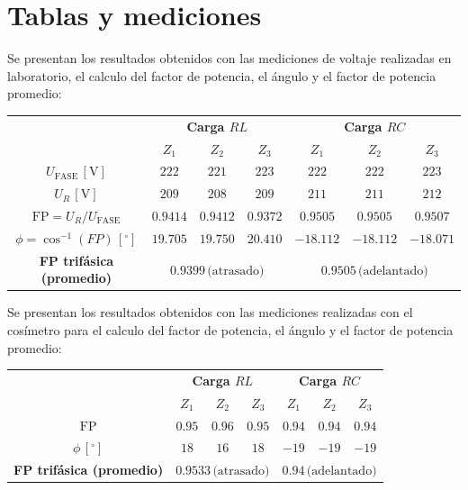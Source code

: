 \documentclass[letter,11pt]{article}
\begin{document}
\section{Tablas y mediciones}
Se presentan los resultados obtenidos con las mediciones de voltaje realizadas
en laboratorio, el calculo del factor de potencia, el ángulo y el factor de
potencia promedio:
\begin{center}
    \begin{tabular}{|c||c|c|c||c|c|c|}
    \hline
    \multirow{2}{*}{} &
    \multicolumn{3}{|c||}{\textbf{Carga $RL$}} &
    \multicolumn{3}{|c|}{\textbf{Carga $RC$}}\\
    & $Z_1$ & $Z_2$ & $Z_3$ & $Z_1$ & $Z_2$ & $Z_3$\\
    \hline \hline
    $U_{\text{FASE}}\,[\text{V}]$ &
    $222$ &
    $221$ &
    $223$ &
    $222$ &
    $222$ &
    $223$
    \tabularnewline \hline
    $U_R\,[\text{V}]$ &
    $209$ &
    $208$ &
    $209$ &
    $211$ &
    $211$ &
    $212$
    \tabularnewline \hline
    $\text{FP} = U_R/U_{\text{FASE}}$ &
    $0.9414$ &
    $0.9412$ &
    $0.9372$ &
    $0.9505$ &
    $0.9505$ &
    $0.9507$
    \tabularnewline \hline
    $\phi = \cos^{-1}(FP)\,[^{\circ}]$ &
    $19.705$ &
    $19.750$ &
    $20.410$ &
    $-18.112$ &
    $-18.112$ &
    $-18.071$
    \tabularnewline \hline \hline
    \textbf{FP trifásica (promedio)} &
    \multicolumn{3}{|c||}{$0.9399\,\text{(atrasado)}$} &
    \multicolumn{3}{|c|}{$0.9505\,\text{(adelantado)}$}
    \tabularnewline \hline
    \end{tabular}
\end{center}
\vspace{0.6cm}

Se presentan los resultados obtenidos con las mediciones realizadas con el
cosímetro para el calculo del factor de potencia, el ángulo y el factor de
potencia promedio:
\begin{center}
    \begin{tabular}{|c||c|c|c||c|c|c|}
    \hline
    \multirow{2}{*}{} &
    \multicolumn{3}{|c||}{\textbf{Carga $RL$}} &
    \multicolumn{3}{|c|}{\textbf{Carga $RC$}}\\
    & $Z_1$ & $Z_2$ & $Z_3$ & $Z_1$ & $Z_2$ & $Z_3$\\
    \hline \hline
    $\text{FP}$ &
    $0.95$ &
    $0.96$ &
    $0.95$ &
    $0.94$ &
    $0.94$ &
    $0.94$
    \tabularnewline \hline
    $\phi\,[^{\circ}]$ &
    $18$ &
    $16$ &
    $18$ &
    $-19$ &
    $-19$ &
    $-19$
    \tabularnewline \hline \hline
    \textbf{FP trifásica (promedio)} &
    \multicolumn{3}{|c||}{$0.9533\,\text{(atrasado)}$} &
    \multicolumn{3}{|c|}{$0.94\,\text{(adelantado)}$}
    \tabularnewline \hline
    \end{tabular}
\end{center}
\end{document}
